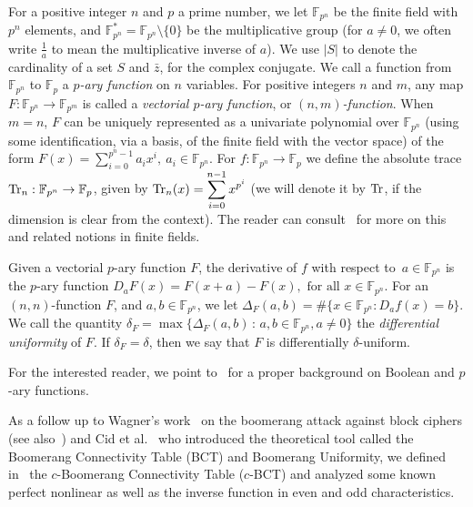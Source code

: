 \documentclass[11pt]{article}
\newcommand{\Tr}{{\rm Tr}}
\newcommand{\Trn}{{\rm Tr}_n}
\def\F{{\mathbb F}}
\newcommand{\cardinality}[1]{\# #1}
\begin{document}
For a positive integer $n$ and $p$ a prime number, we let $\F_{p^n}$ be the  finite field with $p^n$ elements, and $\F_{p^n}^*=\F_{p^n}\setminus\{0\}$ be the multiplicative group (for $a\neq 0$, we often write $\frac{1}{a}$ to mean the multiplicative inverse of $a$).  We use $|{S}|$ to denote the cardinality of a set $S$ and $\bar z$, for the complex conjugate.
We call a function from $\F_{p^n}$   to $\F_p$  a {\em $p$-ary  function} on $n$ variables. For positive integers $n$ and $m$, any map $F:\F_{p^n}\to\F_{p^m}$   is called a {\em vectorial $p$-ary  function}, or {\em $(n,m)$-function}. When $m=n$, $F$ can be uniquely represented as a univariate polynomial over $\F_{p^n}$ (using some identification, via a basis, of the finite field with the vector space) of the form
$
F(x)=\sum_{i=0}^{p^n-1} a_i x^i,\ a_i\in\F_{p^n}.
$
For $f:\F_{p^n}\to \F_p$ we define the absolute trace $\Trn:\F_{p^n}\to \F_p$, given by $\displaystyle \Trn(x)=\sum_{i=0}^{n-1} x^{p^i}$ (we will denote it by $\Tr$, if the dimension is clear from the context).  The reader can consult~\cite{LN97} for more on this and related notions in finite fields.
  
Given a vectorial $p$-ary  function $F$, the derivative of $f$ with respect to~$a \in \F_{p^n}$ is the $p$-ary  function
$
 D_{a}F(x) =  F(x + a)- F(x), \mbox{ for  all }  x \in \F_{p^n}.
$ 
For an $(n,n)$-function $F$, and $a,b\in\F_{p^n}$, we let $\Delta_F(a,b)=\cardinality{\{x\in\F_{p^n} : D_{a}f(x)=b\}}$. We call the quantity
$\delta_F=\max\{\Delta_F(a,b)\,:\, a,b\in \F_{p^n}, a\neq 0 \}$ the {\em differential uniformity} of $F$. If $\delta_F= \delta$, then we say that $F$ is differentially $\delta$-uniform. 

For the interested reader, we point to~\cite{Bud14,CH1,CH2,CS17,MesnagerBook,Tok15} for a proper background on  Boolean and $p$-ary functions.

  
As a follow up to Wagner's work~\cite{Wag99} on the boomerang attack against block ciphers (see also~\cite{BK99,KKS00,BDK02,Kim12}) and  Cid et al.~\cite{Cid18} who introduced the theoretical tool called  the Boomerang Connectivity Table (BCT) and Boomerang Uniformity, we defined in~\cite{S20} the $c$-Boomerang Connectivity Table ($c$-BCT) and analyzed some known perfect nonlinear as well as the inverse function in even and odd characteristics.  
\end{document}

